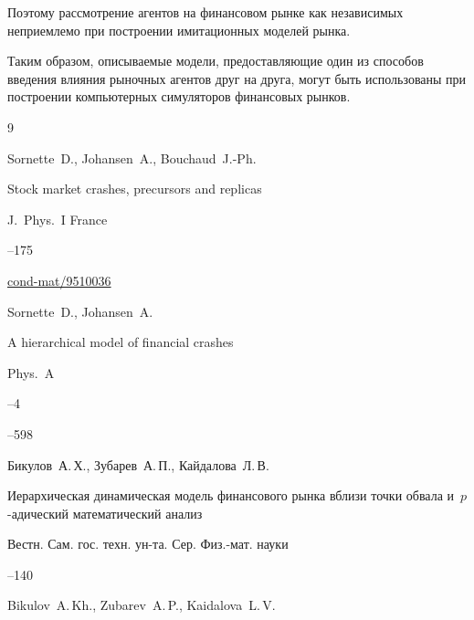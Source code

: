 Поэтому рассмотрение агентов на финансовом рынке как независимых неприемлемо при построении имитационных моделей рынка.

Таким образом, описываемые модели, предоставляющие один из способов введения влияния рыночных агентов друг на друга, могут быть использованы при построении компьютерных симуляторов финансовых рынков.





\begin{thebibliography}{9}




\by  Sornette~D.,  Johansen~A.,  Bouchaud~J.-Ph.

\paper Stock market crashes, precursors and replicas

\jour J.~Phys.~I France




--175

\arxiv 	\href{http://arxiv.org/abs/cond-mat/9510036}{cond-mat/9510036}






\by Sornette~D.,  Johansen~A.

\paper A hierarchical model of financial crashes

\jour Phys.~A


--4


--598










\by Бикулов~А.\,Х., Зубарев~А.\,П., Кайдалова~Л.\,В.

\paper Иерархическая динамическая модель финансового рынка вблизи точки обвала и~$p$-адический математический анализ

\jour Вестн. Сам. гос. техн. ун-та. Сер. Физ.-мат. науки



--140

\misctransl Bikulov~A.\,Kh., Zubarev~A.\,P., Kaidalova~L.\,V.


\end{thebibliography}
